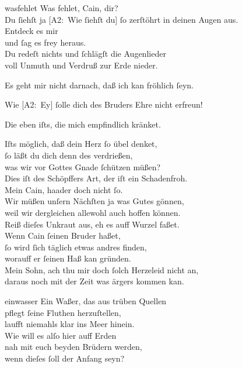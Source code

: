 \documentclass[abbrwidth=6em,tocstyle=ref-genre]{ees}
\newcommand\altlyrics[1]{[\textmd{A2}:~#1]}
\begin{document}
{\begin{movement}{wasfehlet}
  \voice[Eva]
  Was fehlet, Cain, dir?\\
  Du ſiehſt ja \altlyrics{Wie ſiehſt du} ſo zerſtöhrt in deinen Augen aus.\\
  Entdeck es mir\\
  und ſag es frey heraus.\\
  Du redeſt nichts und ſchlägſt die Augenlieder\\
  voll Unmuth und Verdruß zur Erde nieder.

  \voice[Cain]
  Es geht mir nicht darnach, daß ich kan fröhlich ſeyn.

  \voice[Eva]
  Wie \altlyrics{Ey} ſolle dich des Bruders Ehre nicht erfreun!

  \voice[Cain]
  Die eben iſts, die mich empfindlich kränket.

  \voice[Eva]
  Iſts möglich, daß dein Herz ſo übel denket,\\
  ſo läßt du dich denn des verdrießen,\\
  was wir vor Gottes Gnade ſchützen müßen?\\
  Dies iſt des Schöpffers Art, der iſt ein Schadenfroh.\\
  Mein Cain, haader doch nicht ſo.\\
  Wir müßen unſern Nächſten ja was Gutes gönnen,\\
  weil wir dergleichen allewohl auch hoffen können.\\
  Reiß dieſes Unkraut aus, eh es auff Wurzel faßet.\\
  Wenn Cain ſeinen Bruder haßet,\\
  ſo wird ſich täglich etwas andres finden,\\
  worauff er ſeinen Haß kan gründen.\\
  Mein Sohn, ach thu mir doch ſolch Herzeleid nicht an,\\
  daraus noch mit der Zeit was ärgers kommen kan.
\end{movement}

\begin{movement}{einwasser}
  \voice[Eva]
  Ein Waßer, das aus trüben Quellen\\
  pflegt ſeine Fluthen herzuſtellen,\\
  laufft niemahls klar ins Meer hinein.\\
  Wie will es alſo hier auff Erden\\
  nah mit euch beyden Brüdern werden,\\
  wenn dieſes ſoll der Anfang seyn?
\end{movement}

}
\end{document}
